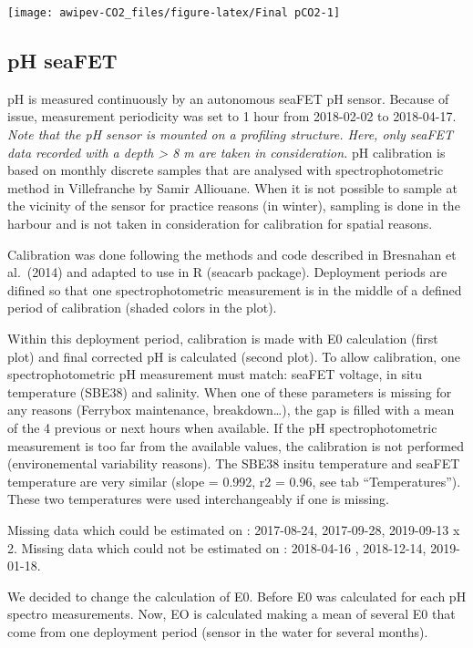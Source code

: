 \documentclass[
]{article}
\begin{document}
\begin{center}\texttt{[image: awipev-CO2\_files/figure-latex/Final pCO2-1]} \end{center}

\hypertarget{ph-seafet}{%
\subsection{pH seaFET}\label{ph-seafet}}

pH is measured continuously by an autonomous seaFET pH sensor. Because
of issue, measurement periodicity was set to 1 hour from 2018-02-02 to
2018-04-17. \emph{Note that the pH sensor is mounted on a profiling
structure. Here, only seaFET data recorded with a depth \textgreater{} 8
m are taken in consideration.} pH calibration is based on monthly
discrete samples that are analysed with spectrophotometric method in
Villefranche by Samir Alliouane. When it is not possible to sample at
the vicinity of the sensor for practice reasons (in winter), sampling is
done in the harbour and is not taken in consideration for calibration
for spatial reasons.

Calibration was done following the methods and code described in
Bresnahan et al.~(2014) and adapted to use in R (seacarb package).
Deployment periods are difined so that one spectrophotometric
measurement is in the middle of a defined period of calibration (shaded
colors in the plot).

Within this deployment period, calibration is made with E0 calculation
(first plot) and final corrected pH is calculated (second plot). To
allow calibration, one spectrophotometric pH measurement must match:
seaFET voltage, in situ temperature (SBE38) and salinity. When one of
these parameters is missing for any reasons (Ferrybox maintenance,
breakdown\ldots), the gap is filled with a mean of the 4 previous or
next hours when available. If the pH spectrophotometric measurement is
too far from the available values, the calibration is not performed
(environemental variability reasons). The SBE38 insitu temperature and
seaFET temperature are very similar (slope = 0.992, r2 = 0.96, see tab
``Temperatures''). These two temperatures were used interchangeably if
one is missing.

Missing data which could be estimated on : 2017-08-24, 2017-09-28,
2019-09-13 x 2. Missing data which could not be estimated on :
2018-04-16 , 2018-12-14, 2019-01-18.

We decided to change the calculation of E0. Before E0 was calculated for
each pH spectro measurements. Now, EO is calculated making a mean of
several E0 that come from one deployment period (sensor in the water for
several months).
\end{document}
